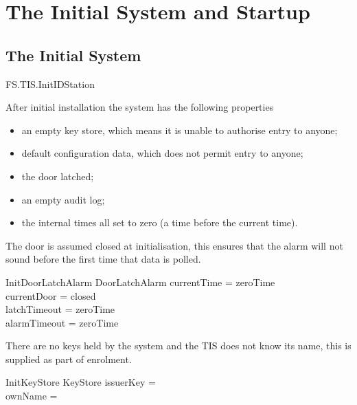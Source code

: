 
\chapter{The Initial System and Startup}
\label{sec:Start}
\section{The Initial System}

\begin{traceunit}{FS.TIS.InitIDStation}
\end{traceunit}

After initial installation the system has the following properties
\begin{itemize}
\item
an empty key store, which means it is unable to authorise entry to anyone;
\item
default configuration data, which does not permit entry to anyone;
\item
the door latched;
\item
an empty audit log;
\item
the internal times all set to zero (a time before the current time).
\end{itemize}

The door is assumed closed at initialisation, this ensures that the alarm
will not sound before the first time that data is polled.

\begin{schema}{InitDoorLatchAlarm}
        DoorLatchAlarm
\where
	currentTime = zeroTime
\\	currentDoor = closed
\\	latchTimeout = zeroTime
\\	alarmTimeout = zeroTime
\end{schema}

There are no keys held by the system and the TIS does not know its
name, this is supplied as part of enrolment.

\begin{schema}{InitKeyStore}
        KeyStore
\where
        issuerKey = \emptyset
\\      ownName = \Nil
\end{schema}

